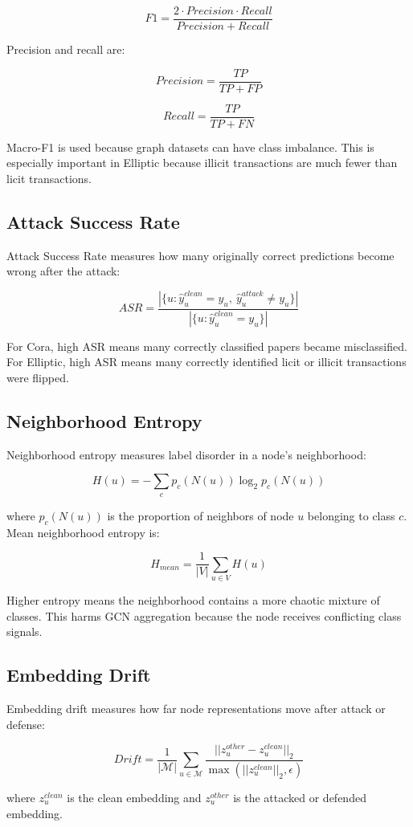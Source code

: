 \documentclass[12pt,a4paper]{article}
\begin{document}
$$
F1=\frac{2\cdot Precision\cdot Recall}{Precision+Recall}
$$

Precision and recall are:

$$
Precision=\frac{TP}{TP+FP}
$$

$$
Recall=\frac{TP}{TP+FN}
$$

Macro-F1 is used because graph datasets can have class imbalance. This is especially important in Elliptic because illicit transactions are much fewer than licit transactions.

\subsection{Attack Success Rate}
Attack Success Rate measures how many originally correct predictions become wrong after the attack:

$$
ASR=\frac{|\{u:\hat{y}^{clean}_u=y_u,\ \hat{y}^{attack}_u\neq y_u\}|}
{|\{u:\hat{y}^{clean}_u=y_u\}|}
$$

For Cora, high ASR means many correctly classified papers became misclassified. For Elliptic, high ASR means many correctly identified licit or illicit transactions were flipped.

\subsection{Neighborhood Entropy}
Neighborhood entropy measures label disorder in a node's neighborhood:

$$
H(u)=-\sum_{c}p_c(N(u))\log_2 p_c(N(u))
$$

where $p_c(N(u))$ is the proportion of neighbors of node $u$ belonging to class $c$. Mean neighborhood entropy is:

$$
H_{mean}=\frac{1}{|V|}\sum_{u\in V}H(u)
$$

Higher entropy means the neighborhood contains a more chaotic mixture of classes. This harms GCN aggregation because the node receives conflicting class signals.

\subsection{Embedding Drift}
Embedding drift measures how far node representations move after attack or defense:

$$
Drift=\frac{1}{|\mathcal{M}|}\sum_{u\in\mathcal{M}}
\frac{||z_u^{other}-z_u^{clean}||_2}{\max(||z_u^{clean}||_2,\epsilon)}
$$

where $z_u^{clean}$ is the clean embedding and $z_u^{other}$ is the attacked or defended embedding.
\end{document}
